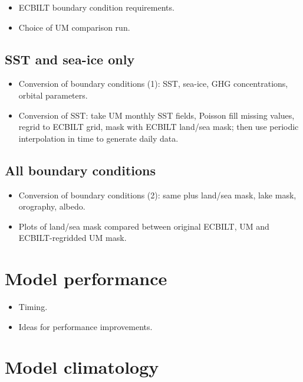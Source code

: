 \documentclass[a4paper,11pt,article]{memoir}
\begin{document}
\begin{itemize}
  \item{ECBILT boundary condition requirements.}
  \item{Choice of UM comparison run.}
\end{itemize}

\section{SST and sea-ice only}

\begin{itemize}
  \item{Conversion of boundary conditions (1): SST, sea-ice, GHG
    concentrations, orbital parameters.}
  \item{Conversion of SST: take UM monthly SST fields, Poisson fill
    missing values, regrid to ECBILT grid, mask with ECBILT land/sea
    mask; then use periodic interpolation in time to generate daily
    data.}
\end{itemize}

\section{All boundary conditions}

\begin{itemize}
  \item{Conversion of boundary conditions (2): same plus land/sea
    mask, lake mask, orography, albedo.}
  \item{Plots of land/sea mask compared between original ECBILT, UM
    and ECBILT-regridded UM mask.}
\end{itemize}


\chapter{Model performance}

\begin{itemize}
  \item{Timing.}
  \item{Ideas for performance improvements.}
\end{itemize}


\chapter{Model climatology}
\end{document}

